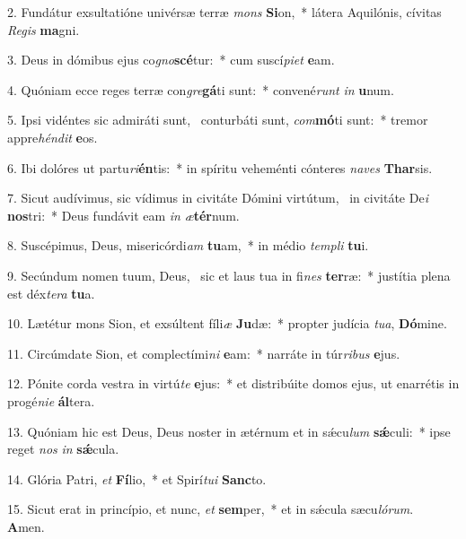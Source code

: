 2. Fundátur exsultatióne univérsæ terræ \textit{mons} \textbf{Si}on,~*  látera Aquilónis, cívitas \textit{Re}\textit{gis} \textbf{ma}gni.\

3. Deus in dómibus ejus co\textit{gno}\textbf{scé}tur:~*  cum suscí\textit{pi}\textit{et} \textbf{e}am.\

4. Quóniam ecce reges terræ con\textit{gre}\textbf{gá}ti sunt:~*  convené\textit{runt} \textit{in} \textbf{u}num.\

5. Ipsi vidéntes sic admiráti sunt, \dag\  conturbáti sunt, \textit{com}\textbf{mó}ti sunt:~*  tremor appre\textit{hén}\textit{dit} \textbf{e}os.\

6. Ibi dolóres ut partu\textit{ri}\textbf{én}tis:~*  in spíritu veheménti cónteres \textit{na}\textit{ves} \textbf{Thar}sis.\

7. Sicut audívimus, sic vídimus in civitáte Dómini virtútum, \dag\  in civitáte De\textit{i} \textbf{nos}tri:~*  Deus fundávit eam \textit{in} \textit{æ}\textbf{tér}num.\

8. Suscépimus, Deus, misericórdi\textit{am} \textbf{tu}am,~*  in médio \textit{tem}\textit{pli} \textbf{tu}i.\

9. Secúndum nomen tuum, Deus, \dag\  sic et laus tua in fi\textit{nes} \textbf{ter}ræ:~*  justítia plena est déx\textit{te}\textit{ra} \textbf{tu}a.\

10. Lætétur mons Sion, et exsúltent fíli\textit{æ} \textbf{Ju}dæ:~*  propter judícia \textit{tu}\textit{a}, \textbf{Dó}mine.\

11. Circúmdate Sion, et complectími\textit{ni} \textbf{e}am:~*  narráte in túr\textit{ri}\textit{bus} \textbf{e}jus.\

12. Pónite corda vestra in virtú\textit{te} \textbf{e}jus:~*  et distribúite domos ejus, ut enarrétis in progé\textit{ni}\textit{e} \textbf{ál}tera.\

13. Quóniam hic est Deus, Deus noster in ætérnum et in sǽcu\textit{lum} \textbf{sǽ}culi:~*  ipse reget \textit{nos} \textit{in} \textbf{sǽ}cula.\

14. Glória Patri, \textit{et} \textbf{Fí}lio,~*  et Spirí\textit{tu}\textit{i} \textbf{Sanc}to.\

15. Sicut erat in princípio, et nunc, \textit{et} \textbf{sem}per,~*  et in sǽcula sæcu\textit{ló}\textit{rum}. \textbf{A}men.\


